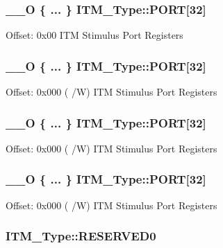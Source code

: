 \hypertarget{struct_i_t_m___type_ad124e191d9330582936b0519712ecfcb}{
\subsubsection[{P\-O\-R\-T}]{\setlength{\rightskip}{0pt plus 5cm}\-\_\-\-\_\-\-O \{ ... \}    I\-T\-M\-\_\-\-Type\-::\-P\-O\-R\-T\mbox{[}32\mbox{]}}}\label{struct_i_t_m___type_ad124e191d9330582936b0519712ecfcb}
Offset\-: 0x00 I\-T\-M Stimulus Port Registers \hypertarget{struct_i_t_m___type_aafb7292348aac298f6652bc1fba35fb6}{
\subsubsection[{P\-O\-R\-T}]{\setlength{\rightskip}{0pt plus 5cm}\-\_\-\-\_\-\-O \{ ... \}    I\-T\-M\-\_\-\-Type\-::\-P\-O\-R\-T\mbox{[}32\mbox{]}}}\label{struct_i_t_m___type_aafb7292348aac298f6652bc1fba35fb6}
Offset\-: 0x000 ( /\-W) I\-T\-M Stimulus Port Registers \hypertarget{struct_i_t_m___type_a45e9e82805fec74de6658b2f238f3616}{
\subsubsection[{P\-O\-R\-T}]{\setlength{\rightskip}{0pt plus 5cm}\-\_\-\-\_\-\-O \{ ... \}    I\-T\-M\-\_\-\-Type\-::\-P\-O\-R\-T\mbox{[}32\mbox{]}}}\label{struct_i_t_m___type_a45e9e82805fec74de6658b2f238f3616}
Offset\-: 0x000 ( /\-W) I\-T\-M Stimulus Port Registers \hypertarget{struct_i_t_m___type_a4efd85680da427c5bf1dbd874c7a15a0}{
\subsubsection[{P\-O\-R\-T}]{\setlength{\rightskip}{0pt plus 5cm}\-\_\-\-\_\-\-O \{ ... \}    I\-T\-M\-\_\-\-Type\-::\-P\-O\-R\-T\mbox{[}32\mbox{]}}}\label{struct_i_t_m___type_a4efd85680da427c5bf1dbd874c7a15a0}
Offset\-: 0x000 ( /\-W) I\-T\-M Stimulus Port Registers \hypertarget{struct_i_t_m___type_a8a7ae8e70370c3b26d19fd327d9dcb4d}{
\subsubsection[{R\-E\-S\-E\-R\-V\-E\-D0}]{ I\-T\-M\-\_\-\-Type\-::\-R\-E\-S\-E\-R\-V\-E\-D0}}\label{struct_i_t_m___type_a8a7ae8e70370c3b26d19fd327d9dcb4d}



